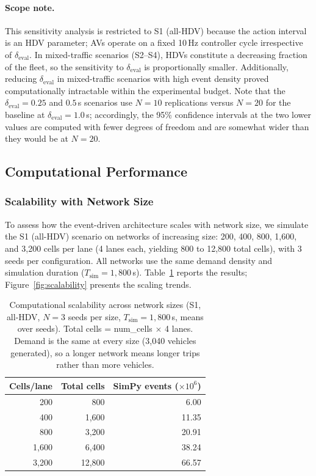\documentclass[review,authoryear]{elsarticle}
\begin{document}
\paragraph{Scope note.} This sensitivity analysis is restricted to S1 (all-HDV) because the action interval is an HDV parameter; AVs operate on a fixed 10\,Hz controller cycle irrespective of $\delta_{\text{eval}}$. In mixed-traffic scenarios (S2--S4), HDVs constitute a decreasing fraction of the fleet, so the sensitivity to $\delta_{\text{eval}}$ is proportionally smaller. Additionally, reducing $\delta_{\text{eval}}$ in mixed-traffic scenarios with high event density proved computationally intractable within the experimental budget. Note that the $\delta_{\text{eval}} = 0.25$ and $0.5$\,s scenarios use $N = 10$ replications versus $N = 20$ for the baseline at $\delta_{\text{eval}} = 1.0$\,s; accordingly, the 95\% confidence intervals at the two lower values are computed with fewer degrees of freedom and are somewhat wider than they would be at $N = 20$.


\subsection{Computational Performance}
\label{sec:exp_performance_new}

\subsubsection{Scalability with Network Size}
\label{sec:exp_scalability}

To assess how the event-driven architecture scales with network size, we simulate the S1 (all-HDV) scenario on networks of increasing size: 200, 400, 800, 1{,}600, and 3{,}200 cells per lane (4 lanes each, yielding 800 to 12{,}800 total cells), with 3 seeds per configuration. All networks use the same demand density and simulation duration ($T_{\text{sim}} = 1{,}800$\,s). Table~\ref{tab:scalability} reports the results; Figure~\ref{fig:scalability} presents the scaling trends.

\begin{table}[ht]
\centering
\caption{Computational scalability across network sizes (S1, all-HDV, $N = 3$ seeds per size, $T_{\text{sim}} = 1{,}800$\,s, means over seeds). Total cells = num\_cells $\times$ 4 lanes. Demand is the same at every size (3{,}040 vehicles generated), so a longer network means longer trips rather than more vehicles.}
\label{tab:scalability}
\begin{tabular}{@{}rrr@{}}
\toprule
Cells/lane & Total cells & SimPy events ($\times 10^6$) \\
\midrule
200 & 800 & 6.00 \\
400 & 1{,}600 & 11.35 \\
800 & 3{,}200 & 20.91 \\
1{,}600 & 6{,}400 & 38.24 \\
3{,}200 & 12{,}800 & 66.57 \\
\bottomrule
\end{tabular}
\end{table}
\end{document}
